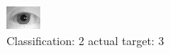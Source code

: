 \begin{figure}[h!]
\begin{center}
\includegraphics[width=0.60\columnwidth]{figures/ID1115_class_2_target_3.png}
\end{center}
\caption{ Classification: 2 actual target: 3}
\label{fig:ID1115_class_2_target_3}
\end{figure}
